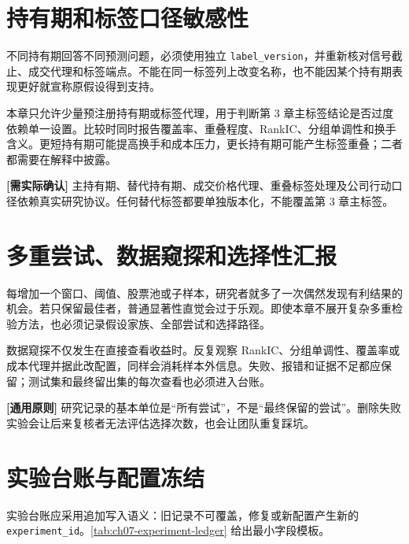 \section{持有期和标签口径敏感性}

不同持有期回答不同预测问题，必须使用独立 \texttt{label\_version}，并重新核对信号截止、成交代理和标签端点。不能在同一标签列上改变名称，也不能因某个持有期表现更好就宣称原假设得到支持。

本章只允许少量预注册持有期或标签代理，用于判断第 3 章主标签结论是否过度依赖单一设置。比较时同时报告覆盖率、重叠程度、RankIC、分组单调性和换手含义。更短持有期可能提高换手和成本压力，更长持有期可能产生标签重叠；二者都需要在解释中披露。

\begin{confirmbox}
\textbf{[需实际确认]} 主持有期、替代持有期、成交价格代理、重叠标签处理及公司行动口径依赖真实研究协议。任何替代标签都要单独版本化，不能覆盖第 3 章主标签。
\end{confirmbox}

\section{多重尝试、数据窥探和选择性汇报}

每增加一个窗口、阈值、股票池或子样本，研究者就多了一次偶然发现有利结果的机会。若只保留最佳者，普通显著性直觉会过于乐观。即使本章不展开复杂多重检验方法，也必须记录假设家族、全部尝试和选择路径。

数据窥探不仅发生在直接查看收益时。反复观察 RankIC、分组单调性、覆盖率或成本代理并据此改配置，同样会消耗样本外信息。失败、报错和证据不足都应保留；测试集和最终留出集的每次查看也必须进入台账。

\begin{principlebox}
\textbf{[通用原则]} 研究记录的基本单位是“所有尝试”，不是“最终保留的尝试”。删除失败实验会让后来复核者无法评估选择次数，也会让团队重复踩坑。
\end{principlebox}

\section{实验台账与配置冻结}

实验台账应采用追加写入语义：旧记录不可覆盖，修复或新配置产生新的 \texttt{experiment\_id}。\cref{tab:ch07-experiment-ledger} 给出最小字段模板。

